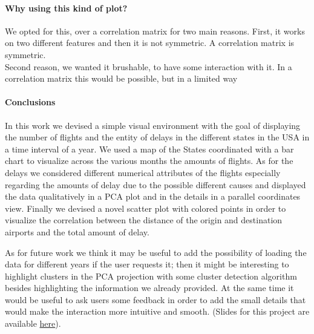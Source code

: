\documentclass[a4paper, 12pt]{article}
\begin{document}
\paragraph{Why using this kind of plot?}
We opted for this, over a correlation matrix for two main reasons. First, it works on two different
features and then it is not symmetric. A correlation matrix is symmetric.
\\
Second reason, we wanted it brushable, to have some interaction with it. In a correlation matrix this
would be possible, but in a limited way



\paragraph*{Conclusions}
In this work we devised a simple visual environment with the goal of displaying the number of flights 
and the entity of delays in the different states in the USA in a time interval of a year. We used a map
of the States coordinated with a bar chart to visualize across the various months the amounts of flights.
As for the delays we considered different numerical attributes of the flights especially regarding the
amounts of delay due to the possible different causes and displayed the data qualitatively in a PCA plot
and in the details in a parallel coordinates view. Finally we devised a novel scatter plot with colored
points in order to visualize the correlation between the distance of the origin and destination airports
and the total amount of delay.

As for future work we think it may be useful to add the possibility of loading the data for different
years if the user requests it; then it might be interesting to highlight clusters in the PCA projection
with some cluster detection algorithm besides highlighting the information we already provided. At the 
same time it would be useful to ask users some feedback in order to add the small details that would
make the interaction more intuitive and smooth.
(Slides for this project are available 
\href{https://docs.google.com/presentation/d/1T_p1oarqUuNt5APTaf7IwTJEzUDJC0CoNfJKHdak0so/edit?usp=sharing}{here}).
\end{document}
